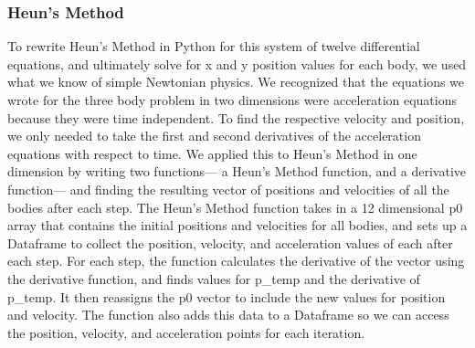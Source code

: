 \documentclass{article}
\begin{document}
\subsubsection{Heun's Method}
To rewrite Heun’s Method in Python for this system of twelve differential equations, and ultimately solve for x and y position values for each body, we used what we know of simple Newtonian physics. We recognized that the equations we wrote for the three body problem in two dimensions were acceleration equations because they were time independent. To find the respective velocity and position, we only needed to take the first and second derivatives of the acceleration equations with respect to time. 
We applied this to Heun’s Method in one dimension by writing two functions— a Heun’s Method function, and a derivative function— and finding the resulting vector of positions and velocities of all the bodies after each step. The Heun’s Method function takes in a 12 dimensional p0 array that contains the initial positions and velocities for all bodies, and sets up a Dataframe to collect the position, velocity, and acceleration values of each after each step. For each step, the function calculates the derivative of the vector using the derivative function, and finds values for p_temp and the derivative of p_temp. It then reassigns the p0 vector to include the new values for position and velocity. The function also adds this data to a Dataframe so we can access the position, velocity, and acceleration points for each iteration. 
\end{document}
